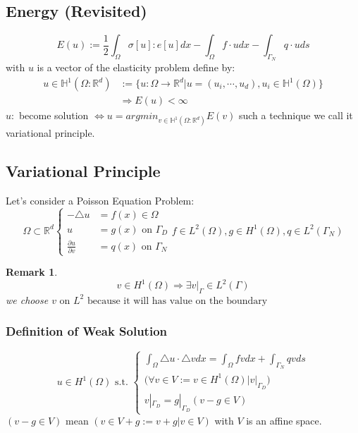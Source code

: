 \documentclass[a4paper,12pt]{article}
\newtheorem{remark}{Remark}[]
\newcommand{\R}{\mathbb{R}}
\newcommand{\Hspace}{\mathbb{H}}
\begin{document}
\subsection{Energy (Revisited)}
\begin{equation}
E(u) := \frac{1}{2}\int_\Omega \sigma[u]:e[u]dx -\int_\Omega f\cdot u dx -\int_{\Gamma_N} q\cdot u ds
\end{equation}
with $u$ is a vector of the elasticity problem define by:
\begin{equation}\nonumber
\begin{aligned}
u\in\Hspace^1(\Omega:\R^d) &:= \{ u:\Omega \rightarrow\R^d |u=(u_i, \cdots, u_d), u_i\in\Hspace^1(\Omega) \}\\
&\Rightarrow E(u) < \infty
\end{aligned}
\end{equation}
$u:$ become solution $\Leftrightarrow u = argmin_{v\in\Hspace^1(\Omega:\R^d)}E(v)$
such a technique we call it variational principle.
\subsection{Variational Principle}
Let's consider a Poisson Equation Problem:
\begin{equation}\label{poissoneq}
\Omega \subset \R^d \begin{cases}
-\triangle u &= f(x) \in\Omega\\
u &= g(x) \text{ on } \Gamma_D\\
\frac{\partial u}{\partial v} &= q(x) \text{ on } \Gamma_N
\end{cases}
f\in L^2(\Omega), g\in H^1(\Omega), q\in L^2(\Gamma_N)
\end{equation}
\begin{remark}
	\begin{equation}\nonumber
	v \in H^1(\Omega) \Rightarrow \exists v|_\Gamma \in L^2(\Gamma)
	\end{equation}
	we choose $v \text{ on } L^2 \text{ because it will has value on the boundary }$
\end{remark}
\subsubsection{Definition of Weak Solution}
\begin{equation}\nonumber
u \in H^1(\Omega)\text{ s.t. } \begin{cases}
\int_\Omega \triangle u \cdot \triangle v dx = \int_\Omega fv dx + \int_{\Gamma_N} qv ds\\
\bigg(\forall v \in V := {v \in H^1(\Omega)\big| v|_{\Gamma_D}}\bigg)\\
v|_{\Gamma_D} = g|_{\Gamma_D} (v-g\in V)
\end{cases}
\end{equation}
$(v-g\in V)$ mean $(v\in V+g:={v+g|v\in V})$ with $V$ is an affine space.
\end{document}
